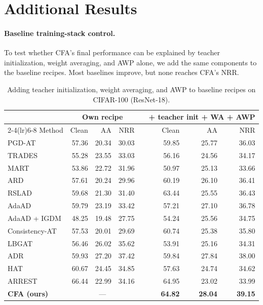 \section{Additional Results}

\paragraph{Baseline training-stack control.}
To test whether CFA's final performance can be explained by teacher
initialization, weight averaging, and AWP alone, we add the same components to
the baseline recipes. Most baselines improve, but none reaches CFA's NRR.

\begin{table}[!htbp]
  \centering
  \scriptsize
  \setlength{\tabcolsep}{4pt}
  \caption{
  Adding teacher initialization, weight averaging, and AWP to baseline
  recipes on CIFAR-100 (ResNet-18).
  }
  \label{tab:baselinestack}
  \begin{tabular}{lrrrcrrr}
    \toprule
    & \multicolumn{3}{c}{Own recipe}
    && \multicolumn{3}{c}{+ teacher init + WA + AWP} \\
    \cmidrule(lr){2-4}\cmidrule(lr){6-8}
    Method & Clean & AA & NRR && Clean & AA & NRR \\
    \midrule
    PGD-AT & 57.36 & 20.34 & 30.03
           && 59.85 & 25.77 & 36.03 \\
    TRADES & 55.28 & 23.55 & 33.03
           && 56.16 & 24.56 & 34.17 \\
    MART & 53.86 & 22.72 & 31.96
         && 50.97 & 25.13 & 33.66 \\
    ARD & 57.61 & 20.24 & 29.96
        && 60.19 & 26.10 & 36.41 \\
    RSLAD & 59.68 & 21.30 & 31.40
          && 63.44 & 25.55 & 36.43 \\
    AdaAD & 59.79 & 23.19 & 33.42
          && 57.21 & 27.10 & 36.78 \\
    AdaAD + IGDM & 48.25 & 19.48 & 27.75
                 && 54.24 & 25.56 & 34.75 \\
    Consistency-AT & 57.53 & 20.01 & 29.69
                   && 60.74 & 25.38 & 35.80 \\
    LBGAT & 56.46 & 26.02 & 35.62
          && 53.91 & 25.16 & 34.31 \\
    ADR & 59.93 & 27.20 & 37.42
        && 59.84 & 27.84 & 38.00 \\
    HAT & 60.67 & 24.45 & 34.85
        && 57.63 & 24.74 & 34.62 \\
    ARREST & 66.44 & 22.99 & 34.16
           && 64.95 & 23.02 & 33.99 \\
    \midrule
    \textbf{CFA (ours)}
      & \multicolumn{3}{c}{---}
      && \textbf{64.82} & \textbf{28.04} & \textbf{39.15} \\
    \bottomrule
  \end{tabular}
\end{table}
\label{app:more}

